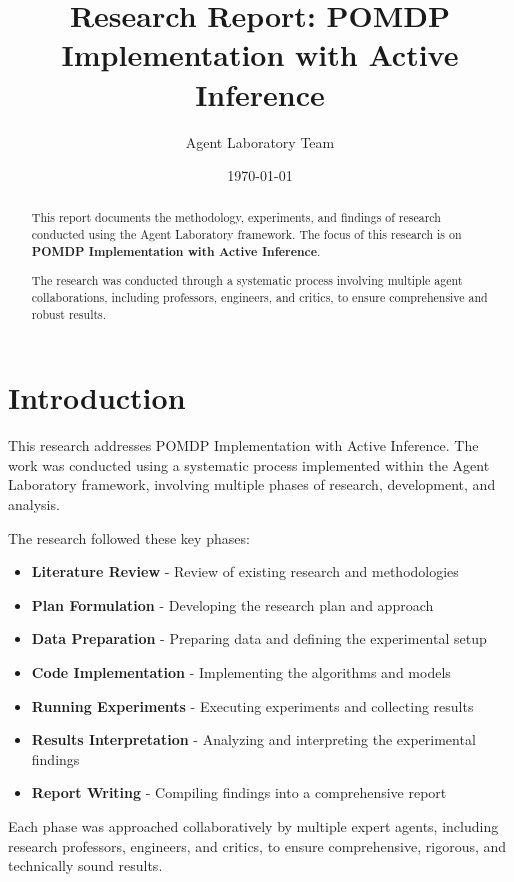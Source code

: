 \documentclass[11pt,a4paper]{article}
\title{Research Report: POMDP Implementation with Active Inference}
\author{Agent Laboratory Team}
\date{\today}
\begin{document}
\maketitle

\begin{abstract}
This report documents the methodology, experiments, and findings of research conducted using the Agent Laboratory framework. The focus of this research is on \textbf{POMDP Implementation with Active Inference}.

The research was conducted through a systematic process involving multiple agent collaborations, including professors, engineers, and critics, to ensure comprehensive and robust results.
\end{abstract}

\tableofcontents
\newpage

\section{Introduction}
This research addresses POMDP Implementation with Active Inference. The work was conducted using a systematic process implemented within the Agent Laboratory framework, involving multiple phases of research, development, and analysis.

The research followed these key phases:
\begin{itemize}
\item \textbf{Literature Review} - Review of existing research and methodologies
\item \textbf{Plan Formulation} - Developing the research plan and approach
\item \textbf{Data Preparation} - Preparing data and defining the experimental setup
\item \textbf{Code Implementation} - Implementing the algorithms and models
\item \textbf{Running Experiments} - Executing experiments and collecting results
\item \textbf{Results Interpretation} - Analyzing and interpreting the experimental findings
\item \textbf{Report Writing} - Compiling findings into a comprehensive report
\end{itemize}

Each phase was approached collaboratively by multiple expert agents, including research professors, engineers, and critics, to ensure comprehensive, rigorous, and technically sound results.
\end{document}
